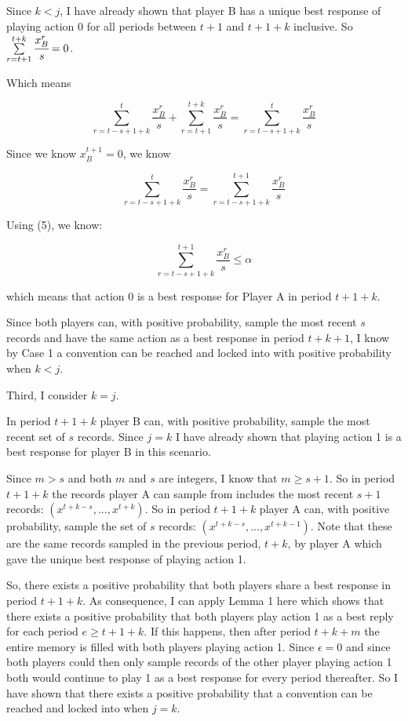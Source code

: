 \documentclass{article}
\begin{document}
Since $k<j$, I have already shown that player B has a unique best response of playing action 0 for all periods between $t+1$ and $t+1+k$ inclusive. So $\sum\limits_{r=t+1}^{t+k} \cfrac{x^r_B}{s}=0$.

Which means 

$$\sum\limits_{r=t-s+1+k}^{t}\frac{x^r_B}{s}+\sum\limits_{r=t+1}^{t+k} \frac{x^r_B}{s}=\sum\limits_{r=t-s+1+k}^{t}\frac{x^r_B}{s}$$

Since we know $x^{t+1}_B = 0$, we know

$$\sum\limits_{r=t-s+1+k}^{t}\frac{x^r_B}{s} = \sum\limits_{r=t-s+1+k}^{t+1}\frac{x^r_B}{s}$$

Using (5), we know:

$$\sum\limits_{r=t-s+1+k}^{t+1} \frac{x^r_B}{s} \leq \alpha$$

which means that action 0 is a best response for Player A in period $t+1+k$.

\vskip6pt

Since both players can, with positive probability, sample the most recent $s$ records and have the same action as a best response in period $t+k+1$, I know by Case 1 a convention can be reached and locked into with positive probability when $k<j$.

\vskip18pt

Third, I consider $k=j$.

\vskip6pt

In period $t+1+k$ player B can, with positive probability, sample the most recent set of $s$ records. Since $j=k$ I have already shown that playing action 1 is a best response for player B in this scenario.

\vskip6pt

Since $m>s$ and both $m$ and $s$ are integers, I know that $m \geq s+1$. So in period $t+1+k$ the records player A can sample from includes the most recent $s+1$ records: $(x^{t+k-s},...,x^{t+k})$. So in period $t+1+k$ player A can, with positive probability, sample the set of $s$ records: $(x^{t+k-s},...,x^{t+k-1})$. Note that these are the same records sampled in the previous period, $t+k$, by player A which gave the unique best response of playing action 1.

\vskip6pt

So, there exists a positive probability that both players share a best response in period $t+1+k$. As consequence, I can apply Lemma 1 here which shows that there exists a positive probability that both players play action 1 as a best reply for each period $e \geq t+1+k$. If this happens, then after period $t+k+m$ the entire memory is filled with both players playing action 1. Since $\epsilon=0$ and since both players could then only sample records of the other player playing action 1 both would continue to play 1 as a best response for every period thereafter. So I have shown that there exists a positive probability that a convention can be reached and locked into when $j=k$. 
\end{document}
